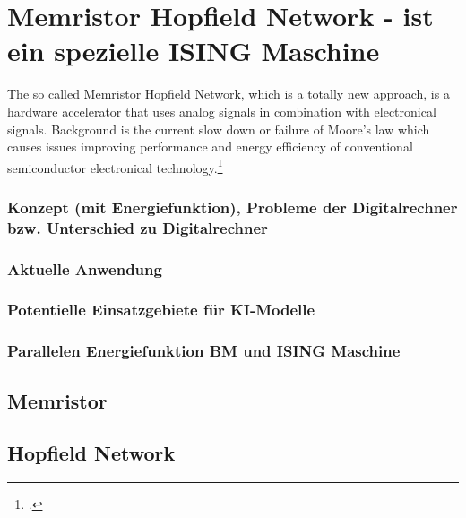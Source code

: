 \section{Memristor Hopfield Network - ist ein spezielle ISING Maschine}

The so called Memristor Hopfield Network, which is a totally new approach, is a hardware accelerator that uses analog signals in combination with electronical signals.
Background is the current slow down or failure of Moore's law which causes issues improving performance and energy efficiency of conventional semiconductor electronical technology.\footcite[cf.][2]{zhouPhotonicMatrixMultiplication2022}

\subsubsection{Konzept (mit Energiefunktion), Probleme der Digitalrechner bzw. Unterschied zu Digitalrechner}
\subsubsection{Aktuelle Anwendung}
\subsubsection{Potentielle Einsatzgebiete für KI-Modelle}
\subsubsection{Parallelen Energiefunktion BM und ISING Maschine}
\subsection{Memristor}
\subsection{Hopfield Network}

